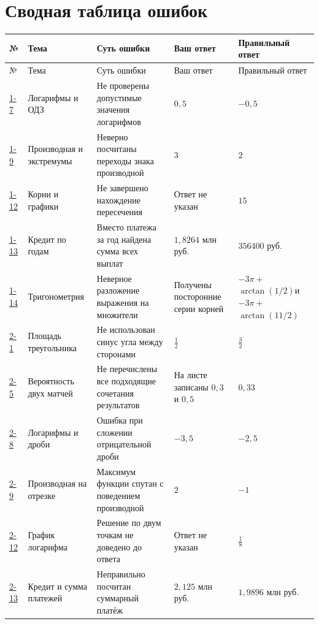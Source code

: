 \documentclass[11pt,a4paper]{article}
\begin{document}
\section*{Сводная таблица ошибок}
\footnotesize
\begin{longtable}{@{}p{1.55cm}p{2.55cm}p{4.15cm}p{2.6cm}p{4.2cm}@{}}
\toprule
№ & Тема & Суть ошибки & Ваш ответ & Правильный ответ\\
\midrule\endfirsthead
\toprule № & Тема & Суть ошибки & Ваш ответ & Правильный ответ\\\midrule\endhead
\hyperref[task:1_7]{1-7} & Логарифмы и ОДЗ & Не проверены допустимые значения логарифмов & $0{,}5$ & $-0{,}5$ \\
\hyperref[task:1_9]{1-9} & Производная и экстремумы & Неверно посчитаны переходы знака производной & $3$ & $2$ \\
\hyperref[task:1_12]{1-12} & Корни и графики & Не завершено нахождение пересечения & Ответ не указан & $15$ \\
\hyperref[task:1_13]{1-13} & Кредит по годам & Вместо платежа за год найдена сумма всех выплат & $1{,}8264$ млн руб. & $356400$ руб. \\
\hyperref[task:1_14]{1-14} & Тригонометрия & Неверное разложение выражения на множители & Получены посторонние серии корней & $-3\pi+$\newline $\arctan(1/2)$\newline и\newline $-3\pi+$\newline $\arctan(11/2)$ \\
\hyperref[task:2_1]{2-1} & Площадь треугольника & Не использован синус угла между сторонами & $\frac12$ & $\frac32$ \\
\hyperref[task:2_5]{2-5} & Вероятность двух матчей & Не перечислены все подходящие сочетания результатов & На листе записаны $0{,}3$ и $0{,}5$ & $0{,}33$ \\
\hyperref[task:2_8]{2-8} & Логарифмы и дроби & Ошибка при сложении отрицательной дроби & $-3{,}5$ & $-2{,}5$ \\
\hyperref[task:2_9]{2-9} & Производная на отрезке & Максимум функции спутан с поведением производной & $2$ & $-1$ \\
\hyperref[task:2_12]{2-12} & График логарифма & Решение по двум точкам не доведено до ответа & Ответ не указан & $\frac18$ \\
\hyperref[task:2_13]{2-13} & Кредит и сумма платежей & Неправильно посчитан суммарный платёж & $2{,}125$ млн руб. & $1{,}9896$ млн руб. \\

\end{longtable}
\end{document}
